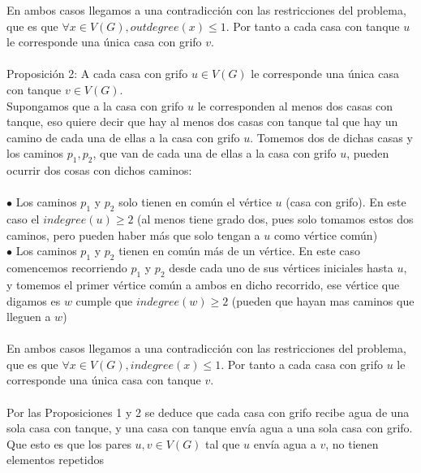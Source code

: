\documentclass{article}
\begin{document}
    En ambos casos llegamos a una contradicci\'on con las restricciones del problema, que es que $\forall x \in V(G), outdegree(x) \leq 1$. 
    Por tanto a cada casa con tanque $u$ le corresponde una \'unica casa con grifo $v$.\\\\

    Proposici\'on 2: A cada casa con grifo $u \in V(G)$ le corresponde una \'unica casa con tanque $v \in V(G)$.\\

    Supongamos que a la casa con grifo $u$ le corresponden al menos dos casas con tanque, eso quiere decir que hay al menos dos casas
    con tanque tal que hay un camino de cada una de ellas a la casa con grifo $u$. Tomemos dos de dichas casas y los caminos $p_1, p_2$,
     que van de cada una de ellas a la casa con grifo $u$, pueden ocurrir dos cosas con dichos caminos:\\\\

    $\bullet$ Los caminos $p_1$ y $p_2$ solo tienen en com\'un el v\'ertice $u$ (casa con grifo). En este caso
    el $indegree(u) \geq 2$ (al menos tiene grado dos, pues solo tomamos estos dos caminos, pero pueden haber m\'as que
    solo tengan a $u$ como v\'ertice com\'un)\\
 
    $\bullet$ Los caminos $p_1$ y $p_2$ tienen en com\'un m\'as de un v\'ertice. En este caso comencemos recorriendo $p_1$ y $p_2$ desde cada
    uno de sus v\'ertices iniciales hasta $u$, y tomemos el primer v\'ertice com\'un a ambos en dicho recorrido, ese v\'ertice que digamos es $w$
    cumple que $indegree(w) \geq 2$ (pueden que hayan mas caminos que lleguen a $w$)\\\\

    En ambos casos llegamos a una contradicci\'on con las restricciones del problema, que es que $\forall x \in V(G), indegree(x) \leq 1$. 
    Por tanto a cada casa con grifo $u$ le corresponde una \'unica casa con tanque $v$.\\\\

    Por las Proposiciones 1 y 2 se deduce que cada casa con grifo recibe agua de una sola casa con tanque, y una casa con tanque env\'ia agua a
    una sola casa con grifo. Que esto es que los pares $u,v \in V(G)$ tal que $u$ env\'ia agua a $v$, no tienen elementos repetidos\\\\\
\end{document}
